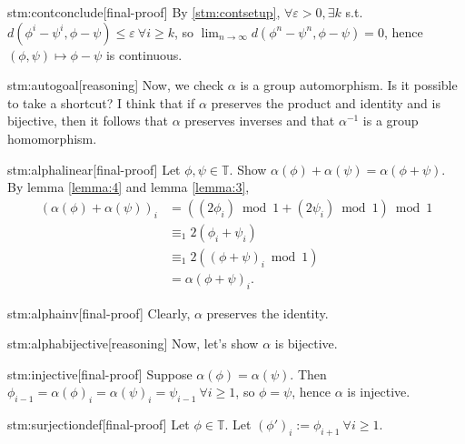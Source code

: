 \documentclass{article}
\begin{document}
\begin{stm}{stm:contconclude}[final-proof]
By \ref{stm:contsetup}, $\forall \varepsilon > 0, \exists k$ s.t. $d(\phi^i - \psi^i, \phi - \psi) \le \varepsilon \ \forall i \ge k$, so $\lim_{n \to \infty} d(\phi^n - \psi^n, \phi - \psi) = 0$, hence $(\phi, \psi) \mapsto \phi - \psi$ is continuous.
\end{stm}

\begin{stm}{stm:autogoal}[reasoning]
Now, we check $\alpha$ is a group automorphism. Is it possible to take a shortcut? I think that if $\alpha$ preserves the product and identity and is bijective, then it follows that $\alpha$ preserves inverses and that $\alpha^{-1}$ is a group homomorphism.
\end{stm}

\begin{stm}{stm:alphalinear}[final-proof]
    Let $\phi, \psi \in \mathbb{T}$. Show $\alpha(\phi) + \alpha(\psi) = \alpha(\phi + \psi)$. By lemma \ref{lemma:4} and lemma \ref{lemma:3},
    \begin{align*}
    (\alpha(\phi) + \alpha(\psi))_i 
    &= \left((2\phi_i) \bmod 1 + (2\psi_i) \bmod 1\right) \bmod 1 \\
    &\equiv_1 2(\phi_i + \psi_i) \\
    &\equiv_1 2\left((\phi + \psi)_i \bmod 1\right) \\
    &= \alpha(\phi + \psi)_i.
    \end{align*}
\end{stm}

\begin{stm}{stm:alphainv}[final-proof]
Clearly, $\alpha$ preserves the identity.
\end{stm}

\begin{stm}{stm:alphabijective}[reasoning]
Now, let’s show $\alpha$ is bijective.
\end{stm}

\begin{stm}{stm:injective}[final-proof]
Suppose $\alpha(\phi) = \alpha(\psi)$. Then $\phi_{i-1} = \alpha(\phi)_i = \alpha(\psi)_i = \psi_{i-1} \ \forall i \ge 1$, so $\phi = \psi$, hence $\alpha$ is injective.
\end{stm}

\begin{stm}{stm:surjectiondef}[final-proof]
Let $\phi \in \mathbb{T}$. Let $(\phi')_i := \phi_{i+1} \ \forall i \ge 1$.
\end{stm}
\end{document}
